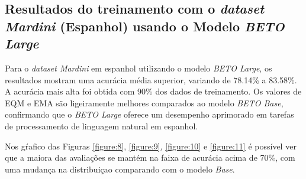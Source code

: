 

\FloatBarrier


\subsection{Resultados do treinamento com o \textit{dataset Mardini} (Espanhol) usando o Modelo \textit{BETO Large}}

Para o \textit{dataset Mardini} em espanhol utilizando o modelo \textit{BETO Large}, os resultados mostram uma acurácia média superior, variando de 78.14\% a 83.58\%. A acurácia mais alta foi obtida com 90\% dos dados de treinamento. Os valores de EQM e EMA são ligeiramente melhores comparados ao modelo \textit{BETO Base}, confirmando que o \textit{BETO Large} oferece um desempenho aprimorado em tarefas de processamento de linguagem natural em espanhol.

\begin{table}[h!]
\centering
{}
\caption{Resultados de Regressão para Diferentes Percentuais de Treino com o \textit{dataset Mardini} (Espanhol) usando o Modelo \textit{BETO Large}}
\label{tab:resultados_regressao_espanhol_large}
\end{table}

Nos gŕafico das Figuras \ref{figure:8}, \ref{figure:9}, \ref{figure:10} e \ref{figure:11} é possível ver que a maiora das avaliações se mantém na faixa de acurácia acima de 70\%, com uma mudança na distribuiçao comparando com o modelo \textit{Base}.

